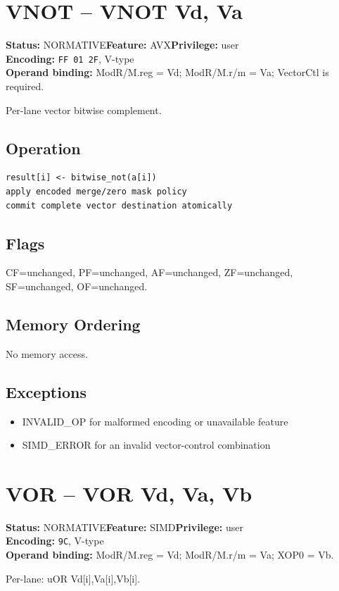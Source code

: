 \documentclass[10pt]{article}
\begin{document}
\section{VNOT -- VNOT Vd, Va}
\textbf{Status:} NORMATIVE\quad \textbf{Feature:} AVX\quad \textbf{Privilege:} user\\
\textbf{Encoding:} \texttt{FF 01 2F}, V-type\\
\textbf{Operand binding:} ModR/M.reg = Vd; ModR/M.r/m = Va; VectorCtl is required.

Per-lane vector bitwise complement.

\subsection*{Operation}
\begin{lstlisting}
result[i] <- bitwise_not(a[i])
apply encoded merge/zero mask policy
commit complete vector destination atomically
\end{lstlisting}
\subsection*{Flags}
CF=unchanged, PF=unchanged, AF=unchanged, ZF=unchanged, SF=unchanged, OF=unchanged.
\subsection*{Memory Ordering}
No memory access.
\subsection*{Exceptions}
\begin{itemize}
\item INVALID\_OP for malformed encoding or unavailable feature
\item SIMD\_ERROR for an invalid vector-control combination
\end{itemize}
\clearpage

\section{VOR -- VOR Vd, Va, Vb}
\textbf{Status:} NORMATIVE\quad \textbf{Feature:} SIMD\quad \textbf{Privilege:} user\\
\textbf{Encoding:} \texttt{9C}, V-type\\
\textbf{Operand binding:} ModR/M.reg = Vd; ModR/M.r/m = Va; XOP0 = Vb.

Per-lane: uOR Vd[i],Va[i],Vb[i].
\end{document}

